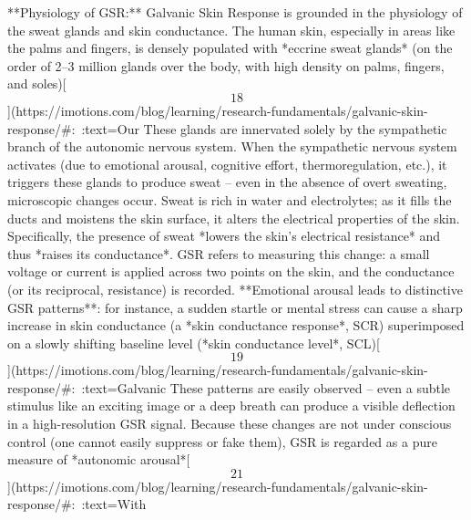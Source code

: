 \documentclass[12pt,a4paper]{article}
\begin{document}
**Physiology of GSR:** Galvanic Skin Response is grounded in the
physiology of the sweat glands and skin conductance. The human skin,
especially in areas like the palms and fingers, is densely populated
with *eccrine sweat glands* (on the order of 2--3 million glands over
the body, with high density on palms, fingers, and
soles)[\[18\]](https://imotions.com/blog/learning/research-fundamentals/galvanic-skin-response/#:~:text=Our%
These glands are innervated solely by the sympathetic branch of the
autonomic nervous system. When the sympathetic nervous system activates
(due to emotional arousal, cognitive effort, thermoregulation, etc.), it
triggers these glands to produce sweat -- even in the absence of overt
sweating, microscopic changes occur. Sweat is rich in water and
electrolytes; as it fills the ducts and moistens the skin surface, it
alters the electrical properties of the skin. Specifically, the presence
of sweat *lowers the skin's electrical resistance* and thus *raises its
conductance*. GSR refers to measuring this change: a small voltage or
current is applied across two points on the skin, and the conductance
(or its reciprocal, resistance) is recorded. **Emotional arousal leads
to distinctive GSR patterns**: for instance, a sudden startle or mental
stress can cause a sharp increase in skin conductance (a *skin
conductance response*, SCR) superimposed on a slowly shifting baseline
level (*skin conductance level*,
SCL)[\[19\]](https://imotions.com/blog/learning/research-fundamentals/galvanic-skin-response/#:~:text=Galvanic%
These patterns are easily observed -- even a subtle stimulus like an
exciting image or a deep breath can produce a visible deflection in a
high-resolution GSR signal. Because these changes are not under
conscious control (one cannot easily suppress or fake them), GSR is
regarded as a pure measure of *autonomic
arousal*[\[21\]](https://imotions.com/blog/learning/research-fundamentals/galvanic-skin-response/#:~:text=With%
\end{document}
